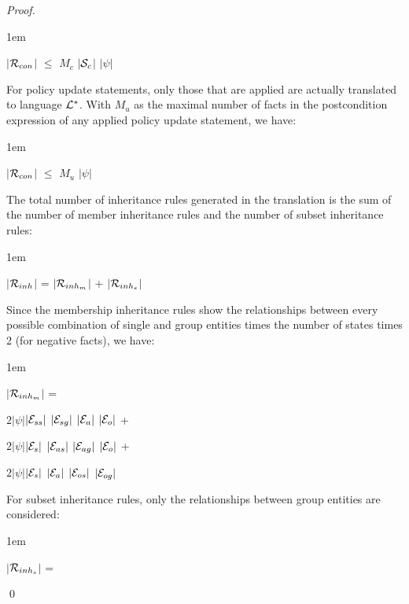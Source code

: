\documentclass[global,twocolumn,final]{svjour}
\newenvironment{vproof}
  {\begin{proof}\hspace{0.25em}}
  {\qed\end{proof}}
\newenvironment{vquote}
  {\begin{list}{}{\leftmargin 1em}\item[]}
  {\end{list}}
\begin{document}
\begin{vproof}
          \begin{vquote}
            $|$${\cal R}_{con}$$|$ $\leq$ $M_{c}$ $|$${\cal S}_{c}$$|$ $|\psi|$
          \end{vquote}

          For policy update statements, only those that are applied are
          actually translated to language ${\cal L}^{*}$. With $M_{u}$ as the
          maximal number of facts in the postcondition expression of any
          applied policy update statement, we have:

          \begin{vquote}
            $|$${\cal R}_{con}$$|$ $\leq$ $M_{u}$ $|\psi|$
          \end{vquote}

          The total number of inheritance rules generated in the translation is
          the sum of the number of member inheritance rules and the number of
          subset inheritance rules:

          \begin{vquote}
            $|$${\cal R}_{inh}$$|$ =
            $|$${\cal R}_{inh_{m}}$$|$ +
            $|$${\cal R}_{inh_{s}}$$|$
          \end{vquote}

          Since the membership inheritance rules show the relationships between
          every possible combination of single and group entities times the
          number of states times 2 (for negative facts), we have:

          \begin{vquote}
            $|$${\cal R}_{inh_{m}}$$|$ =

            \hspace{1em}
            $2|\psi|$$|{\cal E}_{ss}|$ $|{\cal E}_{sg}|$ $|{\cal E}_{a}|$ $|{\cal E}_{o}|$ +

            \hspace{1em}
            $2|\psi|$$|{\cal E}_{s}|$ $|{\cal E}_{as}|$ $|{\cal E}_{ag}|$ $|{\cal E}_{o}|$ +

            \hspace{1em}
            $2|\psi|$$|{\cal E}_{s}|$ $|{\cal E}_{a}|$ $|{\cal E}_{os}|$ $|{\cal E}_{og}|$
          \end{vquote}

          For subset inheritance rules, only the relationships between group
          entities are considered:

          \begin{vquote}
            $|$${\cal R}_{inh_{s}}$$|$ =


\end{vquote}
\end{vproof}
\end{document}
